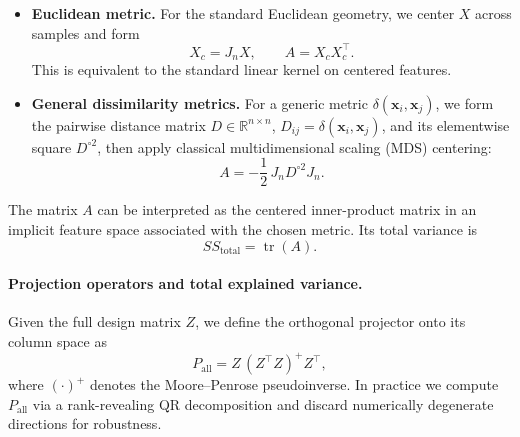 \begin{itemize}
    \item \textbf{Euclidean metric.} For the standard Euclidean geometry, we center $X$ across samples and form
    \begin{equation}
        X_c = J_n X, \qquad
        A = X_c X_c^\top.
    \end{equation}
    This is equivalent to the standard linear kernel on centered features.
    
    
    \item \textbf{General dissimilarity metrics.} For a generic metric $\delta(\mathbf{x}_i,\mathbf{x}_j)$, we form the pairwise distance matrix $D \in \mathbb{R}^{n\times n}$, $D_{ij} = \delta(\mathbf{x}_i,\mathbf{x}_j)$, and its elementwise square $D^{\circ 2}$, then apply classical multidimensional scaling (MDS) centering:
    \begin{equation}
        A = -\frac{1}{2}\, J_n D^{\circ 2} J_n.
    \end{equation}
\end{itemize}

The matrix $A$ can be interpreted as the centered inner-product matrix in an implicit feature space associated with the chosen metric. Its total variance is
\begin{equation}
    SS_{\text{total}} = \operatorname{tr}(A).
\end{equation}

\paragraph{Projection operators and total explained variance.}
Given the full design matrix $Z$, we define the orthogonal projector onto its column space as
\begin{equation}
    P_{\text{all}} = Z\,(Z^\top Z)^+ Z^\top,
\end{equation}
where $(\cdot)^+$ denotes the Moore--Penrose pseudoinverse. In practice we compute $P_{\text{all}}$ via a rank-revealing QR decomposition and discard numerically degenerate directions for robustness.

